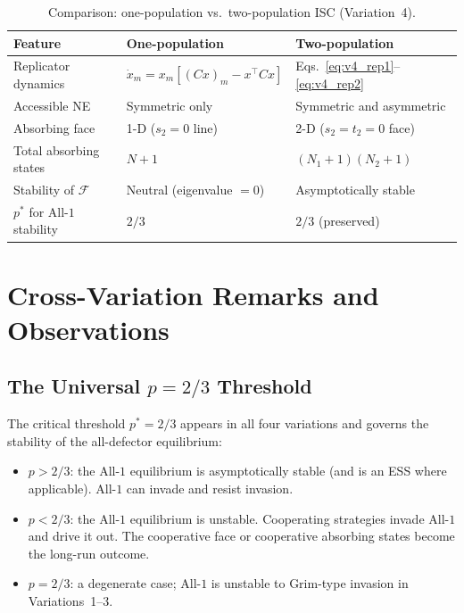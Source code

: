 \documentclass[12pt,a4paper]{article}
\begin{document}
\begin{table}[H]
\centering
\caption{Comparison: one-population vs.\ two-population ISC (Variation~4).}
\label{tab:v4_compare}
\small
\renewcommand{\arraystretch}{1.2}
\begin{tabular}{lll}
\toprule
Feature & One-population & Two-population \\
\midrule
Replicator dynamics   & $\dot x_m=x_m[(Cx)_m-x^\top Cx]$ &
                        Eqs.~\eqref{eq:v4_rep1}--\eqref{eq:v4_rep2} \\
Accessible NE         & Symmetric only & Symmetric and asymmetric \\
Absorbing face        & 1-D ($s_2=0$ line) & 2-D ($s_2=t_2=0$ face) \\
Total absorbing states & $N+1$ & $(N_1+1)(N_2+1)$ \\
Stability of $\mathcal{F}$ & Neutral (eigenvalue $= 0$) & Asymptotically stable \\
$p^*$ for All-$1$ stability & $2/3$ & $2/3$ (preserved) \\
\bottomrule
\end{tabular}
\end{table}

\section{Cross-Variation Remarks and Observations}
\label{sec:remarks}

\subsection{The Universal \texorpdfstring{$p = 2/3$}{p = 2/3} Threshold}

The critical threshold $p^* = 2/3$ appears in all four variations and governs
the stability of the all-defector equilibrium:
\begin{itemize}
  \item $p > 2/3$: the All-$1$ equilibrium is asymptotically stable (and is an
        ESS where applicable). All-$1$ can invade and resist invasion.
  \item $p < 2/3$: the All-$1$ equilibrium is unstable. Cooperating strategies
        invade All-$1$ and drive it out. The cooperative face or cooperative
        absorbing states become the long-run outcome.
  \item $p = 2/3$: a degenerate case; All-$1$ is unstable to Grim-type invasion
        in Variations~1--3.
\end{itemize}
\end{document}
